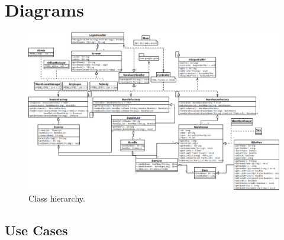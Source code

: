 \documentclass{report}
\begin{document}
\section{Diagrams}

\begin{figure}
  \centering
    \includegraphics[width=\textwidth,height=\textheight,keepaspectratio]{../diagrams/image_versions/overview.png}
    \caption{Class hierarchy.}
\end{figure}

\clearpage

\subsection{Use Cases}
\end{document}
